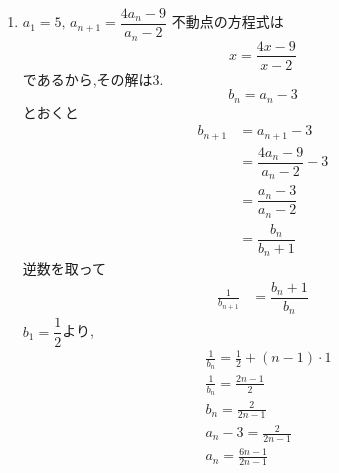 \documentclass[dvipdfmx,a4paper,11pt,fleqn,openany]{jsbook}
\begin{document}
\begin{enumerate}[label=(\arabic*),parsep=3pt]
              このとき,
              \[
                \frac{p-r\alpha}{p-r\beta}=\frac{1-2}{1+2}=-\frac13
              \]
              なので,
              \[
                b_n=\frac{a_n-2}{a_n+2}
              \]
              と置くと,
              \begin{align*}
                &b_{n+1}=-\frac13 b_n,\quad b_1=\frac{a_1-2}{a_1+2}=\frac{-2}{2}=-1\\
                &\therefore \quad b_n=(-1)\left(-\frac13\right)^{n-1}=\frac{(-1)^n}{3^{n-1}}
              \end{align*}
              \[
                b_n=\frac{a_n-2}{a_n+2}
              \]
              を$a_n$について解くと,
              \[
                a_n=\frac{2(1+b_n)}{1-b_n}
              \]
              となるので,
              \[
                b_n=\frac{(-1)^n}{3^{n-1}}
              \]
              を代入し,分母分子に$3^{n-1}$を掛けて整理すると,
              \[
                a_n=\frac{2\left(3^{n-1}+(-1)^n\right)}{3^{n-1}-(-1)^n}
              \]
              を得る.
        \item $\displaystyle a_1=5,\, a_{n+1}=\dfrac{4a_{n}-9}{a_{n}-2}$
              不動点の方程式は
              \[
                x=\frac{4x-9}{x-2}
              \]
              であるから,その解は3.
              \[
              b_n=a_n-3
              \]
              とおくと
              \begin{align*}
                b_{n+1}&=a_{n+1}-3\\
                &=\dfrac{4a_{n}-9}{a_{n}-2}-3\\
                &=\dfrac{a_{n}-3}{a_{n}-2}\\
                &=\dfrac{b_{n}}{b_{n}+1}
              \end{align*}
              逆数を取って
              \begin{align*}
                \frac{1}{b_{n+1}}&=\dfrac{b_{n}+1}{b_{n}}
              \end{align*}
              $b_1=\dfrac{1}{2}$より,
              \begin{align*}
                &\frac{1}{b_n}=\frac{1}{2}+(n-1)\cdot 1\\
                &\frac{1}{b_n}=\frac{2n-1}{2}\\
                &b_n=\frac{2}{2n-1}\\
                &a_n-3=\frac{2}{2n-1}\\
                &a_n=\frac{6n-1}{2n-1}
              \end{align*}

\end{enumerate}
\end{document}
